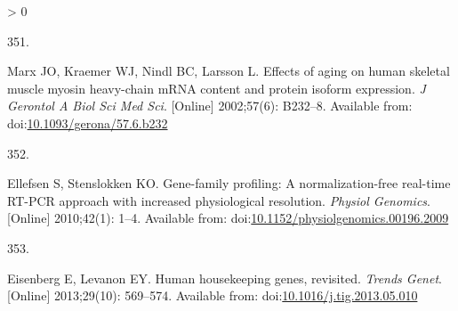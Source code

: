 \documentclass[twoside,10pt]{gihclass} %
\newlength{\cslhangindent}
\newlength{\csllabelwidth}
\newenvironment{CSLReferences}[3] %
 {%
  \setlength{\parindent}{0pt}
  \ifodd #1 \everypar{\setlength{\hangindent}{\cslhangindent}}\ignorespaces\fi
  \ifnum #2 > 0
  \setlength{\parskip}{#2\baselineskip}
  \fi
 }%
 {}
\newcommand{\CSLLeftMargin}[1]{\parbox[t]{\maxof{\widthof{#1}}{\csllabelwidth}}{#1}}
\newcommand{\CSLRightInline}[1]{\parbox[t]{\linewidth}{#1}}
\begin{document}
\begin{CSLReferences}{0}{0}
\leavevmode\hypertarget{ref-RN2445}{}%
\CSLLeftMargin{351. }
\CSLRightInline{Marx JO, Kraemer WJ, Nindl BC, Larsson L. Effects of aging on human skeletal muscle myosin heavy-chain mRNA content and protein isoform expression. \emph{J Gerontol A Biol Sci Med Sci}. {[}Online{]} 2002;57(6): B232--8. Available from: doi:\href{https://doi.org/10.1093/gerona/57.6.b232}{10.1093/gerona/57.6.b232}}

\leavevmode\hypertarget{ref-RN825}{}%
\CSLLeftMargin{352. }
\CSLRightInline{Ellefsen S, Stenslokken KO. Gene-family profiling: A normalization-free real-time RT-PCR approach with increased physiological resolution. \emph{Physiol Genomics}. {[}Online{]} 2010;42(1): 1--4. Available from: doi:\href{https://doi.org/10.1152/physiolgenomics.00196.2009}{10.1152/physiolgenomics.00196.2009}}

\leavevmode\hypertarget{ref-RN1759}{}%
\CSLLeftMargin{353. }
\CSLRightInline{Eisenberg E, Levanon EY. Human housekeeping genes, revisited. \emph{Trends Genet}. {[}Online{]} 2013;29(10): 569--574. Available from: doi:\href{https://doi.org/10.1016/j.tig.2013.05.010}{10.1016/j.tig.2013.05.010}}

\end{CSLReferences}

\end{document}
